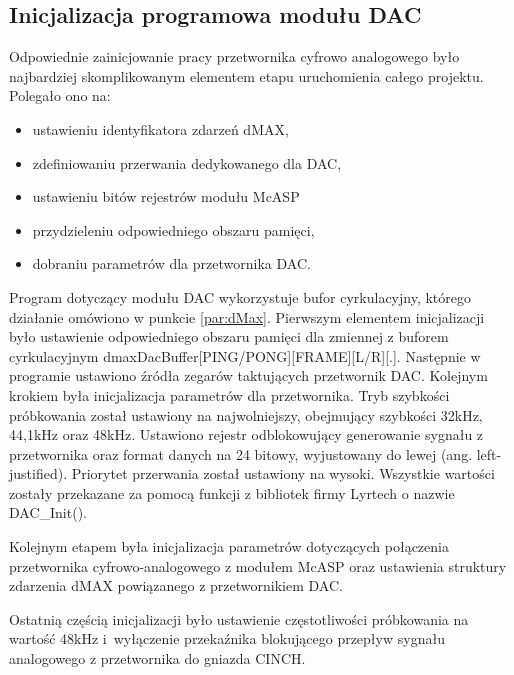 \subsection{Inicjalizacja programowa modułu DAC}
Odpowiednie zainicjowanie pracy przetwornika cyfrowo analogowego było najbardziej skomplikowanym elementem etapu uruchomienia całego projektu. Polegało ono na:
\begin{itemize}
\item ustawieniu identyfikatora zdarzeń dMAX, 
\item zdefiniowaniu przerwania dedykowanego dla DAC, 
\item ustawieniu bitów rejestrów modułu McASP
\item przydzieleniu odpowiedniego obszaru pamięci,
\item dobraniu parametrów dla przetwornika DAC.
\end{itemize}

Program dotyczący modułu DAC wykorzystuje bufor cyrkulacyjny, którego działanie omówiono w punkcie \ref{par:dMax}. Pierwszym elementem inicjalizacji było ustawienie odpowiedniego obszaru pamięci dla zmiennej z buforem cyrkulacyjnym dmaxDacBuffer[PING/PONG][FRAME][L/R][.]. Następnie w programie ustawiono źródła zegarów taktujących przetwornik DAC. Kolejnym krokiem była inicjalizacja parametrów dla przetwornika. Tryb szybkości próbkowania został ustawiony na najwolniejszy, obejmujący szybkości 32kHz, 44,1kHz oraz 48kHz. Ustawiono rejestr odblokowujący generowanie sygnału z przetwornika oraz format danych na 24 bitowy, wyjustowany do lewej (ang. left-justified). 
Priorytet przerwania został ustawiony na wysoki. Wszystkie wartości zostały przekazane za pomocą funkcji z bibliotek firmy Lyrtech o nazwie DAC\_Init().


Kolejnym etapem była inicjalizacja parametrów dotyczących połączenia przetwornika cyfrowo-analogowego z modułem McASP oraz ustawienia struktury zdarzenia dMAX powiązanego z przetwornikiem DAC. 

Ostatnią częścią inicjalizacji było ustawienie częstotliwości próbkowania na wartość 48kHz i~wyłączenie przekaźnika blokującego przepływ sygnału analogowego z przetwornika do gniazda CINCH.

